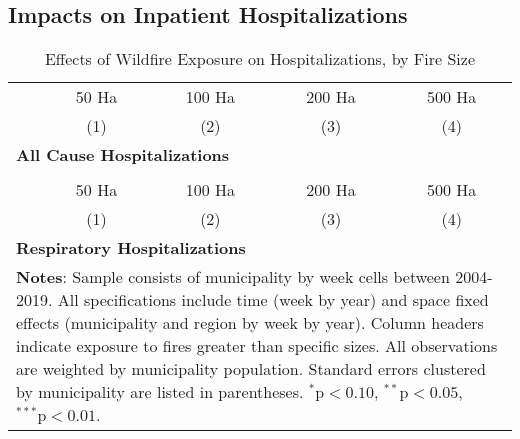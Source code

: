 \documentclass[11pt]{article}
\begin{document}
\begin{spacing}{1.3}
\subsection{Impacts on Inpatient Hospitalizations}
\label{scn:results_hosp}

\begin{table}[htpb!]
    \caption{Effects of Wildfire Exposure on Hospitalizations, by Fire Size}
    \label{tab:RFhospAge}
    \centering
    \begin{tabular}{lcccc} \\ \toprule
    & 50 Ha & 100 Ha & 200 Ha & 500 Ha \\ 
    & (1) & (2) & (3) & (4) \\ \midrule
    \multicolumn{5}{l}{\textbf{All Cause Hospitalizations}}\\
     
    \midrule \\
      & 50 Ha & 100 Ha & 200 Ha & 500 Ha \\ 
    & (1) & (2) & (3) & (4)\\ \midrule
    \multicolumn{5}{l}{\textbf{Respiratory Hospitalizations}}\\
     
    \bottomrule
    \multicolumn{5}{p{11.6cm}}{{\footnotesize \textbf{Notes}: Sample consists of municipality by week cells between 2004-2019.  All specifications include time (week by year) and space fixed effects (municipality and region by week by year).  Column headers indicate exposure to fires greater than specific sizes.  All observations are weighted by municipality population.  Standard errors clustered by municipality are listed in parentheses.   $^{*}\text{p}<0.10$, $^{**}\text{p}<0.05$, $^{***}\text{p}<0.01$.}}
    \end{tabular}
\end{table}



\end{spacing}
\end{document}

